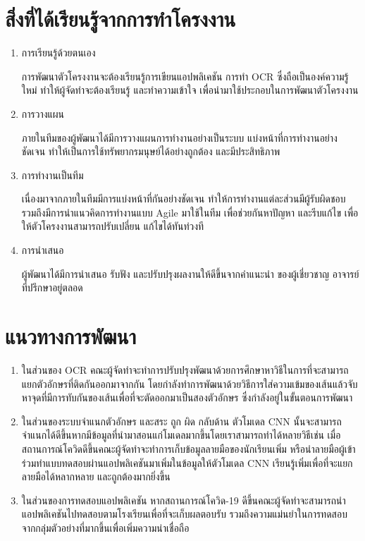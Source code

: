 \documentclass[12pt,oneside,openright,a4paper]{cpe-thai-project}
\begin{document}
\section{สิ่งที่ได้เรียนรู้จากการทำโครงงาน}
\begin{enumerate}
  \item การเรียนรู้ด้วยตนเอง\par
  การพัฒนาตัวโครงงานจะต้องเรียนรู้การเขียนแอปพลิเคชัน
  การทำ OCR ซึ่งถือเป็นองค์ความรู้ใหม่ ทำให้ผู้จัดทำจะต้องเรียนรู้ และทำความเข้าใจ
  เพื่อนำมาใช้ประกอบในการพัฒนาตัวโครงงาน
  \item การวางแผน\par
  ภายในทีมของผู้พัฒนาได้มีการวางแผนการทำงานอย่างเป็นระบบ
  แบ่งหน้าที่การทำงานอย่างชัดเจน 
  ทำให้เป็นการใช้ทรัพยากรมนุษย์ได้อย่างถูกต้อง และมีประสิทธิภาพ
  \item การทำงานเป็นทีม\par
  เนื่องมาจากภายในทีมมีการแบ่งหน้าที่กันอย่างชัดเจน
  ทำให้การทำงานแต่ละส่วนมีผู้รับผิดชอบ รวมถึงมีการนำแนวคิดการทำงานแบบ Agile
  มาใช้ในทีม เพื่อช่วยกันหาปัญหา  และรีบแก้ไข เพื่อให้ตัวโครงงานสามารถปรับเปลี่ยน
  แก้ไขได้ทันท่วงที
  \item การนำเสนอ\par
  ผู้พัฒนาได้มีการนำเสนอ รับฟัง  และปรับปรุงผลงานให้ดีขึ้นจากคำแนะนำ
  ของผู้เชี่ยวชาญ อาจารย์ที่ปรึกษาอยู่ตลอด
\end{enumerate}
\section{แนวทางการพัฒนา}
\begin{enumerate}
  \item ในส่วนของ OCR คณะผู้จัดทำจะทำการปรับปรุงพัฒนาด้วยการศึกษาหาวิธีในการที่จะสามารถแยกตัวอักษรที่ติดกันออกมาจากกัน โดยกำลังทำการพัฒนาด้วยวิธีการใส่ความเข้มของเส้นแล้วจับหาจุดที่มีการทับกันของเส้นเพื่อที่จะตัดออกมาเป็นสองตัวอักษร ซึ่งกำลังอยู่ในขั้นตอนการพัฒนา
  \item ในส่วนของระบบจำแนกตัวอักษร และสระ ถูก ผิด กลับด้าน
        ตัวโมเดล CNN นั้นจะสามารถจำแนกได้ดีขึ้นหากมีข้อมูลที่นำมาสอนแก่โมเดลมากขึ้นโดยเราสามารถทำได้หลายวิธีเช่น เมื่อสถานการณ์โควิดดีขึ้นคณะผู้จัดทำจะทำการเก็บข้อมูลลายมือของนักเรียนเพิ่ม หรือนำลายมือผู้เข้าร่วมทำแบบทดสอบผ่านแอปพลิเคชันมาเพิ่มในข้อมูลให้ตัวโมเดล CNN เรียนรู้เพิ่มเพื่อที่จะแยกลายมือได้หลากหลาย และถูกต้องมากยิ่งขึ้น
  \item ในส่วนของการทดสอบแอปพลิเคชัน หากสถานการณ์โควิด-19 ดีขึ้นคณะผู้จัดทำจะสามารถนำแอปพลิเคชันไปทดสอบตามโรงเรียนเพื่อที่จะเก็บผลตอบรับ รวมถึงความแม่นยำในการทดสอบจากกลุ่มตัวอย่างที่มากขึ้นเพื่อเพิ่มความน่าเชื่อถือ
\end{enumerate}


\nocite{*}


\end{document}
